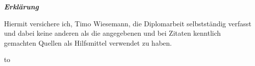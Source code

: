 \newpage
\thispagestyle{empty}



\begin{center}
  \textit{\textbf{Erklärung}}
\end{center}

\hspace*{60mm}



Hiermit versichere ich, Timo Wiesemann, die Diplomarbeit selbstständig verfasst und dabei keine anderen als die angegebenen und bei Zitaten kenntlich gemachten Quellen als Hilfsmittel verwendet zu haben.
\vskip180pt

\hbox to 

\newpage